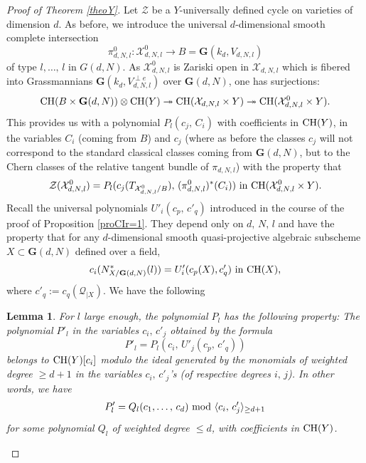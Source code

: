 \documentclass[10pt]{article}
\newtheorem{lemm}[theo]{Lemma}
\begin{document}
\begin{proof}[Proof of Theorem \ref{theoY}]
Let $\mathcal{Z}$ be a $Y$-universally defined cycle on varieties of dimension $d$. As before, we
introduce the universal $d$-dimensional smooth complete intersection
$$\pi_{d,N,l}^0:\mathcal{X}_{d,N,l}^0\rightarrow B=\mathbf{G}(k_d,V_{d,N,l})$$
of type $l,\ldots,\,l$ in $G(d,N)$.
As $\mathcal{X}_{d,N,l}^0$ is Zariski open in
$\mathcal{X}_{d,N,l}$ which is fibered into Grassmannians $\mathbf{G}(k_{d}, V_{d,N,l}^{\perp e})$
over $\mathbf{G}(d,N)$, one has surjections:
$${\rm CH}(B\times \mathbf{G}(d,N))\otimes {\rm CH}(Y)\twoheadrightarrow
{\rm CH}(\mathcal{X}_{d,N,l}\times Y) \twoheadrightarrow {\rm CH}(\mathcal{X}_{d,N,l}^0\times Y).$$
This provides us with a polynomial
$P_l(c_j,\,C_i)$  with coefficients in ${\rm CH}(Y)$, in the variables $C_i$ (coming from $B$) and $c_j$ (where as before
the classes $c_j$  will not correspond to the standard classical classes coming from
$\mathbf{G}(d,N)$, but to the Chern classes of the relative tangent bundle of
$\pi_{d,N,l}$) with the property that
\begin{eqnarray}\label{eqpourZCIY}
\mathcal{Z}(\mathcal{X}_{d,N,l}^0)=P_l(c_j(T_{\mathcal{X}_{d,N,l}^0/B}),\,(\pi_{d,N,l}^0)^*(C_i)) \,\,{\rm in}\,\,
{\rm CH}(\mathcal{X}_{d,N,l}^0\times Y).
\end{eqnarray}
Recall the universal polynomials $U'_i(c_p,\,c'_q)$ introduced in the course of
the proof of Proposition \ref{proCIr=1}. They depend only on $d,\,N,\,l$ and have the property that
for any $d$-dimensional smooth quasi-projective algebraic subscheme $X\subset \mathbf{G}(d,N)$ defined over a field,
\begin{eqnarray} c_i(N_{X/\mathbf{G}(d,N)}^*(l))=U'_i(c_p(X),c'_q)\,\,{\rm in}\,\,{\rm CH}(X),
\end{eqnarray}
where $c'_q:=c_q(\mathcal{Q}_{\mid  X})$.
We have the following
\begin{lemm}\label{leproCIY}   For $l$ large enough, the polynomial $P_l$ has the following property:
The polynomial $P'_l$ in the variables $c_i,\,c'_j$ obtained by the formula
$$P'_l=P_l(c_i,\,U'_j(c_p,\,c'_q))$$
belongs to ${\rm CH}(Y)[c_i]$ modulo the ideal generated by the monomials of weighted degree
$\geq d+1$ in the variables  $c_i,\,c'_j$'s (of respective degrees $i,\,j$). In other words, we have
\begin{eqnarray} P'_l=Q_l(c_1,\ldots,\,c_d)\,\,{\rm mod}\,\,\langle c_i,\,c'_j\rangle_{\geq d+1}\label{eqquilnousfaut}
\end{eqnarray}
for some polynomial $Q_l$ of weighted degree $\leq d$, with coefficients in ${\rm CH}(Y)$.

\end{lemm}
\end{proof}
\end{document}

